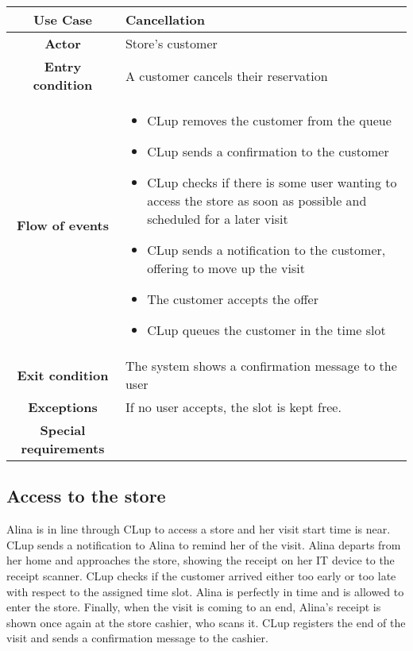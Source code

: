 \documentclass[../../main.tex]{subfiles}
\begin{document}
    \begin{table}[H]
      \centering
        \begin{tabular}{c m{}}
        \hline
        \textbf{Use Case} & Cancellation\\ \hline
        \textbf{Actor} & Store's customer\\ \hline
        \textbf{Entry condition} & A customer cancels their reservation\\  \hline
        \textbf{Flow of events} & \begin{itemize}
                                    \item CLup removes the customer from the queue
                                    \item CLup sends a confirmation to the customer
                                    \item CLup checks if there is some user wanting to access the store as soon as possible and scheduled for a later visit
                                    \item CLup sends a notification to the customer, offering to move up the visit
                                    \item The customer accepts the offer
                                    \item CLup queues the customer in the time slot
                                  \end{itemize}\\ \hline
        \textbf{Exit condition} & The system shows a confirmation message to the user \\ \hline
        \textbf{Exceptions} & If no user accepts, the slot is kept free. \\ \hline
        \textbf{Special requirements} &\\ \hline
        \end{tabular}
    \end{table}

    \subsection{Access to the store}

    Alina is in line through CLup to access a store and her visit start time is near. 
    CLup sends a notification to Alina to remind her of the visit. 
    Alina departs from her home and approaches the store, showing the receipt on her IT device to the receipt scanner. 
    CLup checks if the customer arrived either too early or too late with respect to the assigned time slot. 
    Alina is perfectly in time and is allowed to enter the store. Finally, when the visit is coming to an end, 
    Alina's receipt is shown once again at the store cashier, who scans it. 
    CLup registers the end of the visit and sends a confirmation message to the cashier.
\end{document}
